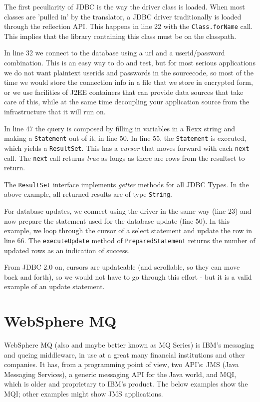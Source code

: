 {The first peculiarity of JDBC is the way the driver class is
loaded. When most classes are 'pulled in' by the translator, a JDBC
driver traditionally is loaded through the reflection API. This
happens in line 22 with the \texttt{Class.forName} call. This implies
that the library containing this class must be on the classpath.

In line 32 we connect to the database using a url and a
userid/password combination. This is an easy way to do and test, but
for most serious applications we do not want plaintext userids and
passwords in the sourcecode, so most of the time we would store the
connection info in a file that we store in encrypted form, or we use
facilities of J2EE containers that can provide data sources that take
care of this, while at the same time decoupling your application
source from the infrastructure that it will run on.

In line 47 the query is composed by filling in variables in a Rexx
string and making a \texttt{Statement} out of it, in line 50. In line
  55, the \texttt{Statement} is executed, which yields a
  \texttt{ResultSet}. This has a \emph{cursor} that moves forward with
  each \texttt{next} call. The \texttt{next} call returns \emph{true}
  as longs as there are rows from the resultset to return.

The \texttt{ResultSet} interface implements \emph{getter} methods for
  all JDBC Types. In the above example, all returned results are of
  type \texttt{String}.

 
For database updates, we connect using the driver in the same way
(line 23) and now prepare the statement used for the database update
(line 50). In this example, we loop through the cursor of a select
statement and update the row in line 66. The \texttt{executeUpdate}
method of \texttt{PreparedStatement} returns the number of updated
rows as an indication of success.

From JDBC 2.0 on, cursors are updateable (and scrollable, so they can
move back and forth), so we would not have to go
through this effort - but it is a valid example of an update statement.
\chapter{WebSphere MQ}
WebSphere MQ (also and maybe better known as MQ Series) is IBM's
messaging and queing middleware, in use at a great many financial
institutions and other companies. It has, from a programming point of
view, two API's: JMS (Java Messaging Services), a generic messaging
API for the Java world, and MQI, which is older and proprietary to
IBM's product. The below examples show the MQI; other examples might
show JMS applications.

}
